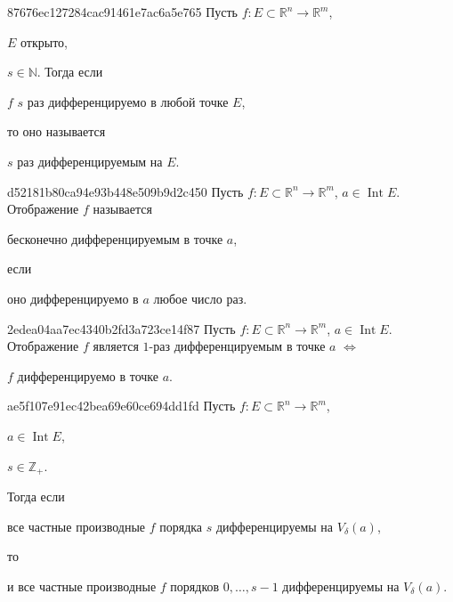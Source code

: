 \begin{note}{87676ec127284cac91461e7ac6a5e765}
    Пусть \({ f : E \subset \mathbb R^{n} \to \mathbb R^{m} }\),\: \begin{icloze}{3}\({ E }\) открыто,\end{icloze}\: \({ s \in \mathbb N }\).
    Тогда если \begin{icloze}{2}\({ f }\) \({ s }\) раз дифференцируемо в любой точке \({ E }\),\end{icloze} то оно называется \begin{icloze}{1}\({ s }\) раз дифференцируемым на \({ E }\).\end{icloze}
\end{note}

\begin{note}{d52181b80ca94e93b448e509b9d2c450}
    Пусть \({ f : E \subset \mathbb R^{n} \to \mathbb R^{m} }\),\: \({ a \in \operatorname{Int} E }\).
    Отображение \({ f }\) называется \begin{icloze}{2}бесконечно дифференцируемым в точке \({ a }\),\end{icloze} если \begin{icloze}{1}оно дифференцируемо в \({ a }\) любое число раз.\end{icloze}
\end{note}

\begin{note}{2edea04aa7ec4340b2fd3a723ce14f87}
    Пусть \({ f : E \subset \mathbb R^{n} \to \mathbb R^{m} }\),\: \({ a \in \operatorname{Int} E }\).
    Отображение \({ f }\) является  \({ 1 }\)-раз дифференцируемым в точке \({ a }\) \({ \iff }\) \begin{icloze}{1}\({ f }\) дифференцируемо в точке \({ a }\).\end{icloze}
\end{note}

\begin{note}{ae5f107e91ec42bea69e60ce694dd1fd}
    Пусть \({ f : E \subset \mathbb R^{n} \to \mathbb R^{m} }\),\: \begin{icloze}{4}\({ a \in \operatorname{Int} E }\),\end{icloze}\: \begin{icloze}{3}\({ s \in \mathbb Z_+ }\).\end{icloze}
    Тогда если \begin{icloze}{2}все частные производные \({ f }\) порядка \({ s }\) дифференцируемы на \({ V_\delta(a) }\),\end{icloze} то
    \begin{icloze}{1}
        и все частные производные \({ f }\) порядков \({ 0, \ldots, s - 1 }\) дифференцируемы на \({ V_\delta(a) }\).
    \end{icloze}
\end{note}

